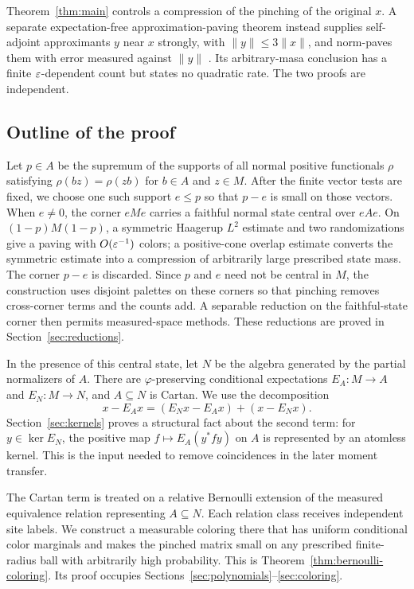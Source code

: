 Theorem~\ref{thm:main} controls a compression of the pinching of the original $x$. A separate expectation-free approximation-paving theorem instead supplies self-adjoint approximants $y$ near $x$ strongly, with $\|y\|\leq3\|x\|$, and norm-paves them with error measured against $\|y\|$ \cite[Theorem~1.1]{ApproxCompanion26}. Its arbitrary-masa conclusion has a finite $\varepsilon$-dependent count but states no quadratic rate. The two proofs are independent.

\subsection{Outline of the proof}

Let $p\in A$ be the supremum of the supports of all normal positive functionals $\rho$ satisfying $\rho(bz)=\rho(zb)$ for $b\in A$ and $z\in M$. After the finite vector tests are fixed, we choose one such support $e\leq p$ so that $p-e$ is small on those vectors. When $e\ne0$, the corner $eMe$ carries a faithful normal state central over $eAe$. On $(1-p)M(1-p)$, a symmetric Haagerup $L^2$ estimate and two randomizations give a paving with $O(\varepsilon^{-1})$ colors; a positive-cone overlap estimate converts the symmetric estimate into a compression of arbitrarily large prescribed state mass. The corner $p-e$ is discarded. Since $p$ and $e$ need not be central in $M$, the construction uses disjoint palettes on these corners so that pinching removes cross-corner terms and the counts add. A separable reduction on the faithful-state corner then permits measured-space methods. These reductions are proved in Section~\ref{sec:reductions}.

In the presence of this central state, let $N$ be the algebra generated by the partial normalizers of $A$. There are $\varphi$-preserving conditional expectations $E_A:M\to A$ and $E_N:M\to N$, and $A\subseteq N$ is Cartan. We use the decomposition
\[
 x-E_Ax=(E_Nx-E_Ax)+(x-E_Nx).
\]
Section~\ref{sec:kernels} proves a structural fact about the second term: for $y\in\ker E_N$, the positive map $f\mapsto E_A(y^*fy)$ on $A$ is represented by an atomless kernel. This is the input needed to remove coincidences in the later moment transfer.

The Cartan term is treated on a relative Bernoulli extension of the measured equivalence relation representing $A\subseteq N$. Each relation class receives independent site labels. We construct a measurable coloring there that has uniform conditional color marginals and makes the pinched matrix small on any prescribed finite-radius ball with arbitrarily high probability. This is Theorem~\ref{thm:bernoulli-coloring}. Its proof occupies Sections~\ref{sec:polynomials}--\ref{sec:coloring}.

